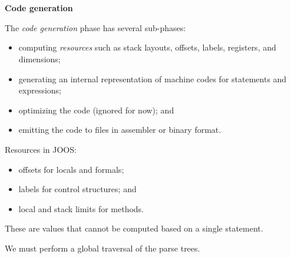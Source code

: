



\begin{slide*}
\begin{tabbing}
\\
~\\
{\Huge\bf Code generation}\\
\end{tabbing}

\vspace{0.4in}

\begin{center}
\end{center}

\vfil
\end{slide*}
 
\begin{slide*}
The {\em code generation\/} phase has several sub-phases:
\begin{itemize}
\item computing {\em resources\/} such as stack layouts, offsets, labels, registers, and dimensions;
\item generating an internal representation of machine codes for statements and expressions; 
\item optimizing the code (ignored for now); and
\item emitting the code to files in assembler or binary format.
\end{itemize}
\vfil
\end{slide*}
 
\begin{slide*}
Resources in JOOS:
\begin{itemize}
\item offsets for locals and formals;
\item labels for control structures; and
\item local and stack limits for methods.
\end{itemize}
These are values that cannot be computed based on a single statement.

We must perform a global traversal of the parse trees.

\vfil
\end{slide*}
 
